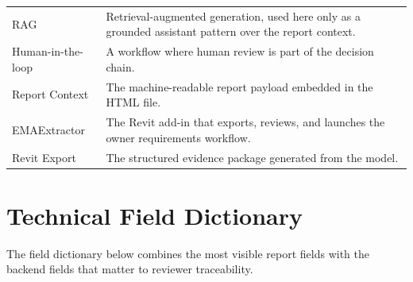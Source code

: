 \documentclass[10pt,letterpaper]{article}
\begin{document}
\begin{longtable}{p{1.7in}p{4.95in}}
RAG & Retrieval-augmented generation, used here only as a grounded assistant pattern over the report context. \\
Human-in-the-loop & A workflow where human review is part of the decision chain. \\
Report Context & The machine-readable report payload embedded in the HTML file. \\
EMAExtractor & The Revit add-in that exports, reviews, and launches the owner requirements workflow. \\
Revit Export & The structured evidence package generated from the model. \\
\bottomrule
\end{longtable}

\section{Technical Field Dictionary}

The field dictionary below combines the most visible report fields with the backend fields that matter to reviewer traceability.
\end{document}
